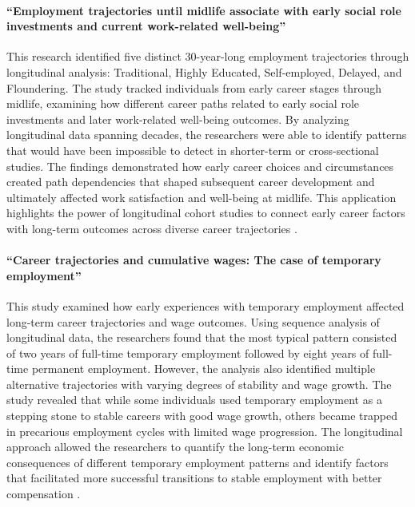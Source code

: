 \documentclass[../main.tex]{subfiles}
\begin{document}
\paragraph{``Employment trajectories until midlife associate with early social role investments and current work-related well-being''}
This research identified five distinct 30-year-long employment trajectories through longitudinal analysis: Traditional, Highly Educated, Self-employed, Delayed, and Floundering. The study tracked individuals from early career stages through midlife, examining how different career paths related to early social role investments and later work-related well-being outcomes. By analyzing longitudinal data spanning decades, the researchers were able to identify patterns that would have been impossible to detect in shorter-term or cross-sectional studies. The findings demonstrated how early career choices and circumstances created path dependencies that shaped subsequent career development and ultimately affected work satisfaction and well-being at midlife. This application highlights the power of longitudinal cohort studies to connect early career factors with long-term outcomes across diverse career trajectories \cite{kokko2013employment}.

\paragraph{``Career trajectories and cumulative wages: The case of temporary employment''}
This study examined how early experiences with temporary employment affected long-term career trajectories and wage outcomes. Using sequence analysis of longitudinal data, the researchers found that the most typical pattern consisted of two years of full-time temporary employment followed by eight years of full-time permanent employment. However, the analysis also identified multiple alternative trajectories with varying degrees of stability and wage growth. The study revealed that while some individuals used temporary employment as a stepping stone to stable careers with good wage growth, others became trapped in precarious employment cycles with limited wage progression. The longitudinal approach allowed the researchers to quantify the long-term economic consequences of different temporary employment patterns and identify factors that facilitated more successful transitions to stable employment with better compensation \cite{manzoni2014career}.
\end{document}
